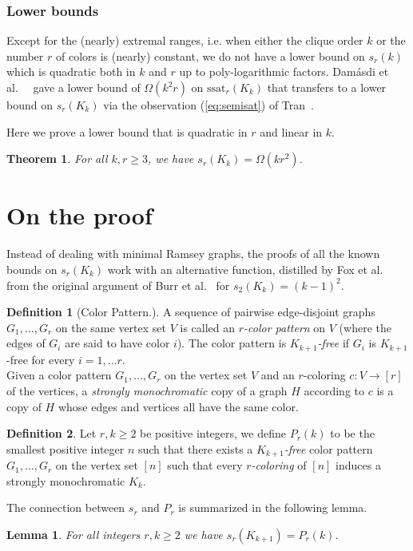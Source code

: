 \documentclass[12pt]{article}
\newcommand{\red}[1]{\textcolor{red}{#1}}
\newtheorem{theorem}{Theorem}
\newtheorem{lemma}{Lemma}
\theoremstyle{definition}
\newtheorem{definition}{Definition}
\begin{document}
	
	\subsubsection{Lower bounds}
	Except for the (nearly) extremal ranges, i.e. when either the clique order $k$ or the number $r$ of colors is (nearly) constant, we do not have a lower bound on $s_r(k)$ which is quadratic both in $k$ and $r$ up to poly-logarithmic factors. 
	Damásdi et al.\ ~\cite{damasdi2021saturation} gave a lower bound of %
    $\Omega (k^2r)$ on $\mathrm{ssat}_r(K_k)$ that transfers to a lower bound on $s_r(K_k)$ via the observation (\ref{eq:semisat}) of Tran~\cite{tran2022two}.
	
	Here we prove a lower bound that is quadratic in $r$ and linear in $k$. 
	
	\begin{theorem}\label{thm: LowerKk+1}
		For all $k,r \geq 3$, we have $s_r(K_{k}) = \Omega(kr^2)$.
	\end{theorem}
	
	
	\section{On the proof}
	Instead of dealing with minimal Ramsey graphs, the proofs of all the known bounds on $s_r(K_k)$ work with an alternative function, distilled by Fox et al.\ \cite{fox2016minimum} from the original argument of Burr et al.\ \cite{burr1976graphs} for $s_2(K_{k}) =(k-1)^2$. 
	
	\begin{definition}[Color Pattern.]
		A sequence of pairwise edge-disjoint graphs $G_1,\dots,G_r$ on the same vertex set $V$ is called an \textit{$r$-color pattern} on $V$ (where the edges of $G_i$ are said to have color $i$). The color pattern is \textit{$K_{k+1}$-free} if $G_i$ is $K_{k+1}$-free for every $i=1, \ldots r$.\\  
		Given a color pattern $G_1,\dots,G_r$ on the vertex set $V$ and an $r$-coloring $c:V\rightarrow [r]$ of the vertices, a \emph{strongly monochromatic} copy of a graph $H$ according to $c$ is a copy of $H$ whose edges and vertices all have the same color.
	\end{definition}
	
	\begin{definition}
		Let $r,k \geq 2$ be positive integers, we define $P_r(k)$ to be the smallest positive integer $n$ such that there exists a $K_{k+1}$\textit{-free} color pattern $G_1,\dots,G_r$ on the vertex set $[n]$ such that every $r$\textit{-coloring} of $[n]$ induces a strongly monochromatic $K_k$.
	\end{definition}
	The connection between $s_r$ and $P_r$ is summarized in the following lemma.
	\begin{lemma}\cite[Theorem 1.5]{fox2016minimum} \label{lem: ColorPattern}
		For all integers $r,k \geq 2$ we have
		$s_r(K_{k+1})=P_r(k).$
	\end{lemma}
	
\end{document}
